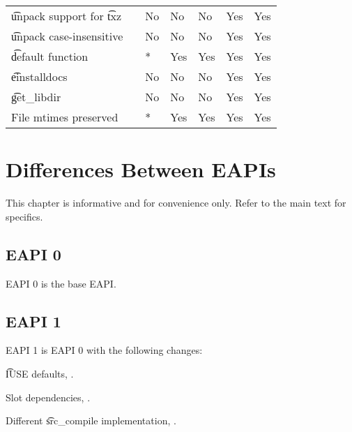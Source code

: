 \begin{landscape}
\begin{longtable}{llP{7.5em}P{7.5em}P{7.5em}P{7.5em}P{7.5em}}
\t{unpack} support for \t{txz} &  &
    No & No & No & Yes & Yes \\

\t{unpack} case-insensitive &  &
    No & No & No & Yes & Yes \\

\t{default} function &  &
    * & Yes & Yes & Yes & Yes \\

\t{einstalldocs} &  &
    No & No & No & Yes & Yes \\

\t{get_libdir} &  &
    No & No & No & Yes & Yes \\

File mtimes preserved &  &
    * & Yes & Yes & Yes & Yes \\

\end{longtable}
\end{landscape}

\chapter{Differences Between EAPIs}

\note This chapter is informative and for convenience only. Refer to the main text for specifics.

\section{EAPI 0}

EAPI 0 is the base EAPI.

\section{EAPI 1}

EAPI 1 is EAPI 0 with the following changes:

\begin{compactitem}
\item \t{IUSE} defaults, .
\item Slot dependencies, .
\item Different \t{src_compile} implementation, .
\end{compactitem}

